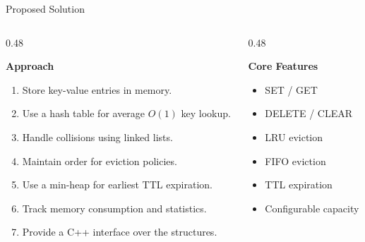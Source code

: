 \documentclass[aspectratio=169,10pt]{beamer}
\begin{document}

\begin{frame}{Proposed Solution}

\begin{columns}[T]

\begin{column}{0.48\textwidth}

\textbf{\color{GEUBlue}Approach}

\begin{enumerate}

\item Store key-value entries in memory.

\item Use a hash table for average $O(1)$ key lookup.

\item Handle collisions using linked lists.

\item Maintain order for eviction policies.

\item Use a min-heap for earliest TTL expiration.

\item Track memory consumption and statistics.

\item Provide a C++ interface over the structures.

\end{enumerate}

\end{column}

\begin{column}{0.48\textwidth}

\textbf{\color{GEUBlue}Core Features}

\begin{itemize}

\item SET / GET

\item DELETE / CLEAR

\item LRU eviction

\item FIFO eviction

\item TTL expiration

\item Configurable capacity


\end{itemize}
\end{column}
\end{columns}
\end{frame}
\end{document}
